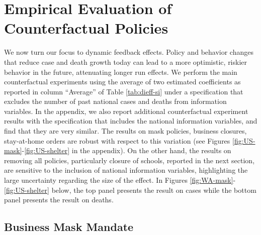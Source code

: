 \documentclass[11pt,reqno,letter]{amsart}
\theoremstyle{definition}
\begin{document}
\section{Empirical Evaluation of Counterfactual Policies}\label{counterfactuals}

We now turn our focus to dynamic feedback effects. Policy
and behavior changes that reduce case and death growth today can lead to a more
optimistic, riskier behavior in the future, attenuating longer run effects.
We perform the main counterfactual experiments using the average of two estimated coefficients as reported in column ``Average'' of Table \ref{tab:dieff-si} under a specification that excludes the number of past national cases and deaths from information variables. In the appendix, we also report additional counterfactual experiment results with the specification that includes the national information variables, and find that they are very similar. The results on mask policies, business closures, stay-at-home orders are robust with respect to this variation (see Figures \ref{fig:US-mask}-\ref{fig:US-shelter} in the appendix). On the other hand, the results on removing all policies, particularly closure of schools, reported in the next section, are sensitive to the inclusion of national information variables, highlighting the large uncertainty regarding the size of the effect.  In Figures \ref{fig:WA-mask}-\ref{fig:US-shelter} below, the top panel presents the result on cases while the bottom panel presents the result on deaths.


\subsection{Business Mask Mandate}
\end{document}
